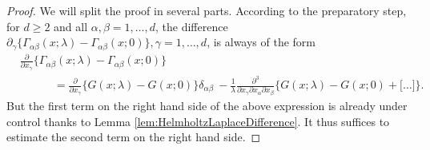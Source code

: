 \begin{proof}
  We will split the proof in several parts.
  According to the preparatory step, for $d \geq 2$ and all $\alpha, \beta = 1,\dots,d$, the difference $\partial_\gamma\{\Gamma_{\alpha\beta}(x; \lambda) - \Gamma_{\alpha\beta}(x; 0)\}, \gamma = 1,\dots,d$, is always of the form
  \begin{align*}
    &\frac{\partial}{\partial x_\gamma}\big\{\Gamma_{\alpha\beta}(x; \lambda) - \Gamma_{\alpha\beta}(x; 0)\big\} \\
    &    \qquad\quad= \frac{\partial}{\partial x_\gamma}\big\{ G(x; \lambda) - G(x; 0) \big\}\delta_{\alpha\beta} \
        - \frac{1}{\lambda} \frac{\partial^3}{\partial x_\gamma \partial x_\alpha \partial x_\beta} \bigg\{ G(x; \lambda) - G(x; 0) + \big[ \dots \big] \bigg\}.
  \end{align*}
  But the first term on the right hand side of the above expression is already under control thanks to Lemma \ref{lem:HelmholtzLaplaceDifference}.
  It thus suffices to estimate the second term on the right hand side.


\end{proof}
